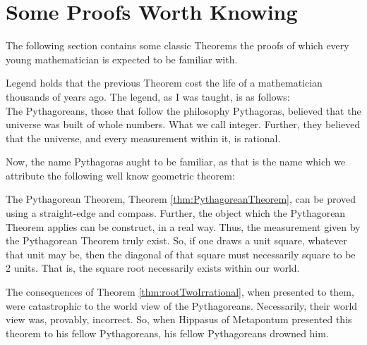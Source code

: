 \guard
\section{Some Proofs Worth Knowing}
\label{someProofsWorthKnowing}

The following section contains some classic Theorems the proofs of which every young mathematician is expected to be familiar with.



Legend holds that the previous Theorem cost the life of a mathematician thousands of years ago.
The legend, as I was taught, is as follows:\\
The Pythagoreans, those that follow the philosophy Pythagoras, believed that the universe was built of whole numbers.
What we call integer.
Further, they believed that the universe, and every measurement within it, is rational.

Now, the name Pythagoras aught to be familiar, as that is the name which we attribute the following well know geometric theorem:

The Pythagorean Theorem, Theorem \ref{thm:PythagoreanTheorem}, can be proved using a straight-edge and compass.
Further, the object which the Pythagorean Theorem applies can be construct, in a real way.
Thus, the measurement given by the Pythagorean Theorem truly exist.
So, if one draws a unit square, whatever that unit may be, then the diagonal of that square must necessarily square to be 2 units.
That is, the square root necessarily exists within our world.

The consequences of Theorem \ref{thm:rootTwoIrrational}, when presented to them, were catastrophic to the world view of the Pythagoreans.
Necessarily, their world view was, provably, incorrect.
So, when Hippasus of Metapontum presented this theorem to his fellow Pythagoreans, his fellow Pythagoreans drowned him.


